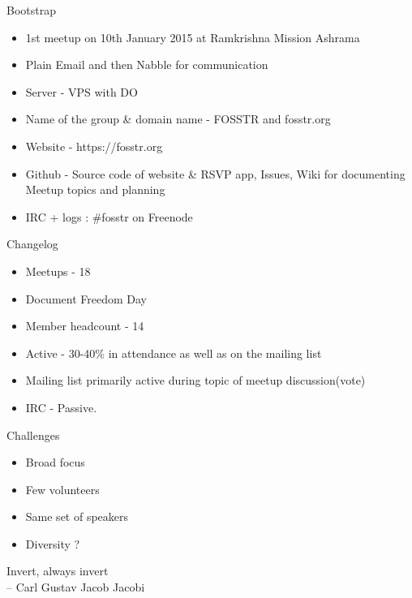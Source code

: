 \documentclass{beamer}
\begin{document}
\begin{frame}{Bootstrap}
\begin{center}
\begin{itemize}
\item 1st meetup on 10th January 2015 at Ramkrishna Mission Ashrama
\item Plain Email and then Nabble for communication 
\item Server - VPS with DO
\item Name of the group \& domain name - FOSSTR and fosstr.org
\item Website - https://fosstr.org
\item Github - Source code of website \& RSVP app, Issues, Wiki for documenting Meetup topics and planning
\item IRC + logs : \#fosstr on Freenode
\end{itemize}
\end{center}
\end{frame}


\begin{frame}{Changelog}
\begin{center}
\begin{itemize}
\item Meetups - 18 
\item Document Freedom Day
\item Member headcount - 14
\item Active - 30-40\% in attendance as well as on the mailing list
\item Mailing list primarily active during topic of meetup discussion(vote)
\item IRC - Passive. 
\end{itemize}
\end{center}
\end{frame}


\begin{frame}{Challenges}
\begin{center}
\begin{itemize}
\item Broad focus 
\item Few volunteers
\item Same set of speakers
\item Diversity ?
\end{itemize}
\end{center}
\end{frame}


\begin{frame}{}
\begin{center}
\large{Invert, always invert}\\
\hfill \small{-- Carl Gustav Jacob Jacobi}
\end{center}
\end{frame}
 
\end{document}

